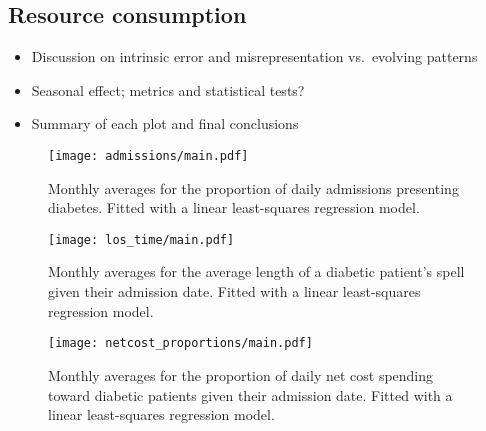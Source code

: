 \subsection{Resource consumption}\label{subsec:diab_resources}

\begin{itemize}
    \item Discussion on intrinsic error and misrepresentation vs.\ evolving
        patterns
    \item Seasonal effect; metrics and statistical tests?
    \item Summary of each plot and final conclusions
\end{itemize}

\begin{figure}[htbp]
    \centering
    \texttt{[image: admissions/main.pdf]}
    \caption{Monthly averages for the proportion of daily admissions presenting
        diabetes. Fitted with a linear least-squares regression model.}%
    \label{fig:admissions}
\end{figure}

\begin{figure}[htbp]
    \centering
    \texttt{[image: los\_time/main.pdf]}
    \caption{Monthly averages for the average length of a diabetic patient's
        spell given their admission date. Fitted with a linear least-squares
        regression model.}%
    \label{fig:los_time}
\end{figure}

\begin{figure}[htbp]
    \centering
    \texttt{[image: netcost\_proportions/main.pdf]}
    \caption{Monthly averages for the proportion of daily net cost spending
        toward diabetic patients given their admission date. Fitted with a
        linear least-squares regression model.}%
    \label{fig:netcost_proportions}
\end{figure}
